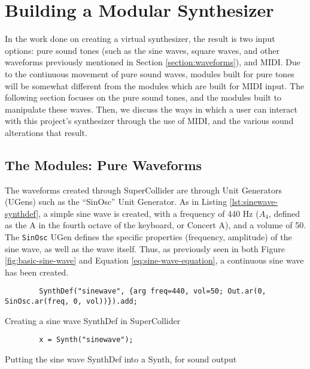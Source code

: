 \chapter{Building a Modular Synthesizer}\label{chapter:building-a-mod-synth}

In the work done on creating a virtual synthesizer, the result is two input options: pure sound tones (such as the sine waves, square waves, and other waveforms previously mentioned in Section \ref{section:waveforms}), and MIDI. Due to the continuous movement of pure sound waves, modules built for pure tones will be somewhat different from the modules which are built for MIDI input. The following section focuses on the pure sound tones, and the modules built to manipulate these waves. Then, we discuss the ways in which a user can interact with this project's synthesizer through the use of MIDI, and the various sound alterations that result.

\section{The Modules: Pure Waveforms}

The waveforms created through SuperCollider are through Unit Generators (UGens) such as the ``SinOsc'' Unit Generator. As in Listing \ref{lst:sinewave-synthdef}, a simple sine wave is created, with a frequency of 440 Hz ($A_4$, defined as the A in the fourth octave of the keyboard, or Concert A), and a volume of 50. The \texttt{SinOsc} UGen defines the specific properties (frequency, amplitude) of the sine wave, as well as the wave itself. Thus, as previously seen in both Figure \ref{fig:basic-sine-wave} and Equation \ref{eq:sine-wave-equation}, a continuous sine wave has been created.

\begin{listing}
	\begin{lstlisting}
		SynthDef("sinewave", {arg freq=440, vol=50; Out.ar(0, SinOsc.ar(freq, 0, vol))}).add;
	\end{lstlisting}
	\caption{Creating a sine wave SynthDef in SuperCollider}
	\label{lst:sinewave-synthdef}
\end{listing}

\begin{listing}
	\begin{lstlisting}
		x = Synth("sinewave");
	\end{lstlisting}
	\caption{Putting the sine wave SynthDef into a Synth, for sound output}
	\label{lst:sinewave-synth}
\end{listing}

